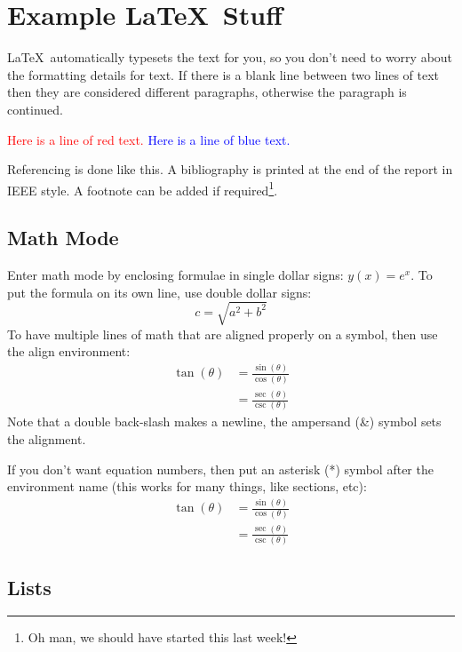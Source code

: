 \documentclass[12pt]{article}
\begin{document}

\newpage

\section{Example \LaTeX\ Stuff}

\LaTeX\ automatically typesets the text for you, so you don't need to worry about the formatting details for text.
If there is a blank line between two lines of text then they are considered different paragraphs, otherwise the paragraph is continued.

\textcolor{red}{Here is a line of red text.}
\textcolor{blue}{Here is a line of blue text.}

Referencing is done like this\cite{Varghese2012}. A bibliography is printed at the end of the report in IEEE style. A footnote can be added if required\footnote{Oh man, we should have started this last week!}.

\subsection{Math Mode}

Enter math mode by enclosing formulae in single dollar signs: $y(x) = e^x$.
To put the formula on its own line, use double dollar signs: $$c = \sqrt{a^2 + b^2}$$
To have multiple lines of math that are aligned properly on a symbol, then use the align environment:
\begin{align}
	\tan(\theta) &= \frac{\sin(\theta)}{\cos(\theta)} \\
		&= \frac{\sec(\theta)}{\csc(\theta)}
\end{align}
Note that a double back-slash makes a newline, the ampersand (\&) symbol sets the alignment.

If you don't want equation numbers, then put an asterisk (*) symbol after the environment name (this works for many things, like sections, etc):
\begin{align*}
	\tan(\theta) &= \frac{\sin(\theta)}{\cos(\theta)} \\
		&= \frac{\sec(\theta)}{\csc(\theta)}
\end{align*}

\subsection{Lists}
\end{document}
